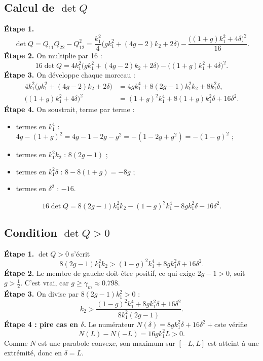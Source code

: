 \documentclass[11pt,a4paper]{article}
\numberwithin{equation}{section}
\theoremstyle{plain}
\theoremstyle{definition}
\theoremstyle{remark}
\begin{document}
\subsection{Calcul de $\det Q$}
\textbf{Étape 1.}
\begin{equation}
\det Q = Q_{11}Q_{22}-Q_{12}^2 = \frac{k_1^2}{4}\Big(gk_1^2+(4g-2)k_2+2\delta\Big) - \frac{\big((1+g)k_1^2+4\delta\big)^2}{16}.
\end{equation}
\textbf{Étape 2.} On multiplie par 16 :
\begin{equation}
16\det Q = 4k_1^2\Big(gk_1^2+(4g-2)k_2+2\delta\Big) - \big((1+g)k_1^2+4\delta\big)^2 .
\end{equation}
\textbf{Étape 3.} On développe chaque morceau :
\begin{align}
4k_1^2\Big(gk_1^2+(4g-2)k_2+2\delta\Big) &= 4gk_1^4 + 8(2g-1)k_1^2k_2 + 8k_1^2\delta,\\
\big((1+g)k_1^2+4\delta\big)^2 &= (1+g)^2k_1^4 + 8(1+g)k_1^2\delta + 16\delta^2 .
\end{align}
\textbf{Étape 4.} On soustrait, terme par terme :
\begin{itemize}
  \item termes en $k_1^4$ : $4g-(1+g)^2 = 4g-1-2g-g^2 = -(1-2g+g^2) = -(1-g)^2$ ;
  \item termes en $k_1^2k_2$ : $8(2g-1)$ ;
  \item termes en $k_1^2\delta$ : $8-8(1+g) = -8g$ ;
  \item termes en $\delta^2$ : $-16$.
\end{itemize}
\begin{equation}\label{eq:detQ}
\boxed{16\det Q = 8(2g-1)k_1^2k_2 - (1-g)^2k_1^4 - 8gk_1^2\delta - 16\delta^2 .}
\end{equation}

\subsection{Condition $\det Q>0$}
\textbf{Étape 1.} $\det Q>0$ s'écrit
\begin{equation}
8(2g-1)k_1^2k_2 > (1-g)^2k_1^4 + 8gk_1^2\delta + 16\delta^2 .
\end{equation}
\textbf{Étape 2.} Le membre de gauche doit être positif, ce qui exige $2g-1>0$, soit $g>\frac12$.
C'est vrai, car $g\ge\gamma_m\approx0.798$.\\
\textbf{Étape 3.} On divise par $8(2g-1)k_1^2>0$ :
\begin{equation}
k_2 > \frac{(1-g)^2k_1^4 + 8gk_1^2\delta + 16\delta^2}{8k_1^2(2g-1)} .
\end{equation}
\textbf{Étape 4 : pire cas en $\delta$.} Le numérateur $N(\delta)=8gk_1^2\delta+16\delta^2+\text{cste}$ vérifie
\begin{equation}
N(L)-N(-L) = 16gk_1^2L>0 .
\end{equation}
Comme $N$ est une parabole convexe, son maximum sur $[-L,L]$ est atteint à une extrémité,
donc en $\delta=L$.
\end{document}
